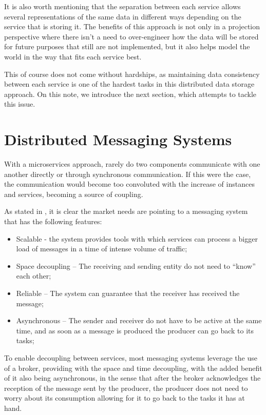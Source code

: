 It is also worth mentioning that the separation between each service allows several representations of the same data in different ways depending on the service that is storing it. The benefits of this approach is not only in a projection perspective where there isn't a need to over-engineer how the data will be stored for future purposes that still are not implemented, but it also helps model the world in the way that fits each service best.

This of course does not come without hardships, as maintaining data consistency between each service is one of the hardest tasks in this distributed data storage approach. On this note, we introduce the next section, which attempts to tackle this issue.


\section{Distributed Messaging Systems}\label{sec:DMS}

With a microservices approach, rarely do two components communicate with one another directly or through synchronous communication. If this were the case, the communication would become too convoluted with the increase of instances and services, becoming a source of coupling. 

As stated in \cite{sharvari2019study}, it is clear the market needs are pointing to a messaging system that has the following features:
\begin{itemize}
    \item Scalable - the system provides tools with which services can process a bigger load of messages in a time of intense volume of traffic;
    \item Space decoupling – The receiving and sending entity do not need to “know” each other;
    \item Reliable – The system can guarantee that the receiver has received the message;
    \item Asynchronous  – The sender and receiver do not have to be active at the same time, and as soon as a message is produced the producer can go back to its tasks;
\end{itemize}


To enable decoupling between services, most messaging systems leverage the use of a broker, providing with the space and time decoupling, with the added benefit of it also being asynchronous, in the sense that after the broker acknowledges the reception of the message sent by the producer, the producer does not need to worry about its consumption allowing for it to go back to the tasks it has at hand. 

